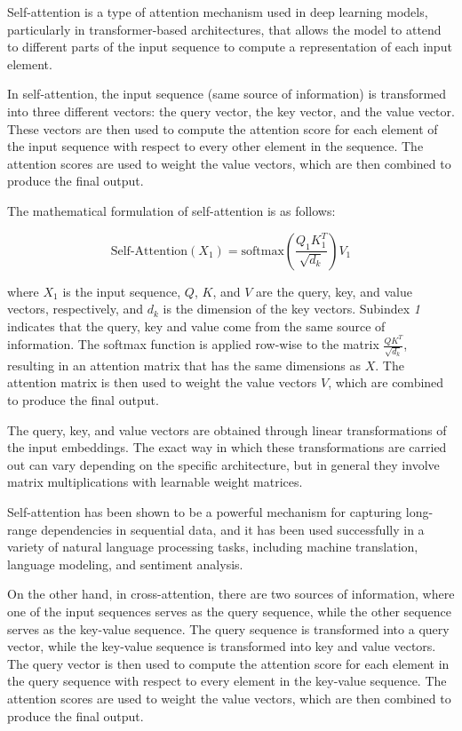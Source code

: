 Self-attention is a type of attention mechanism used in deep learning models, particularly in transformer-based architectures, that allows the model to attend to different parts of the input sequence to compute a representation of each input element.

In self-attention, the input sequence (same source of information) is transformed into three different vectors: the query vector, the key vector, and the value vector. These vectors are then used to compute the attention score for each element of the input sequence with respect to every other element in the sequence. The attention scores are used to weight the value vectors, which are then combined to produce the final output.

The mathematical formulation of self-attention is as follows:

\begin{equation}
	\text{Self-Attention}(X_{1}) = \text{softmax}\left(\frac{Q_{1}K_{1}^T}{\sqrt{d_k}}\right)V_{1}
\end{equation}

where $X_{1}$ is the input sequence, $Q$, $K$, and $V$ are the query, key, and value vectors, respectively, and $d_k$ is the dimension of the key vectors. Subindex \textit{1} indicates that the query, key and value come from the same source of information. The softmax function is applied row-wise to the matrix $\frac{QK^T}{\sqrt{d_k}}$, resulting in an attention matrix that has the same dimensions as $X$. The attention matrix is then used to weight the value vectors $V$, which are combined to produce the final output.

The query, key, and value vectors are obtained through linear transformations of the input embeddings. The exact way in which these transformations are carried out can vary depending on the specific architecture, but in general they involve matrix multiplications with learnable weight matrices.

Self-attention has been shown to be a powerful mechanism for capturing long-range dependencies in sequential data, and it has been used successfully in a variety of natural language processing tasks, including machine translation, language modeling, and sentiment analysis.

On the other hand, in cross-attention, there are two sources of information, where one of the input sequences serves as the query sequence, while the other sequence serves as the key-value sequence. The query sequence is transformed into a query vector, while the key-value sequence is transformed into key and value vectors. The query vector is then used to compute the attention score for each element in the query sequence with respect to every element in the key-value sequence. The attention scores are used to weight the value vectors, which are then combined to produce the final output.

